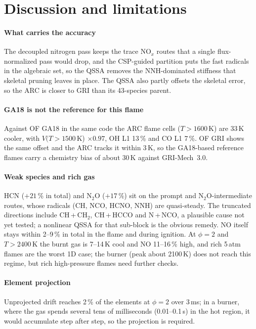 \documentclass[preprint,review,12pt]{elsarticle}
\newcommand{\ce}[1]{\ensuremath{\mathrm{#1}}}
\begin{document}
\section{Discussion and limitations}

\paragraph{What carries the accuracy}
The decoupled nitrogen pass keeps the trace NO$_x$ routes that a single flux-normalized pass would drop, and the
CSP-guided partition puts the fast radicals in the algebraic set, so the QSSA removes the NNH-dominated stiffness that
skeletal pruning leaves in place. The QSSA also partly offsets the skeletal error, so the ARC is closer to GRI than its
43-species parent.

\paragraph{GA18 is not the reference for this flame}
Against OF GA18 in the same code the ARC flame cells ($T>1600$\,K) are 33\,K cooler, with $V(T>1500$\,K)
$\times0.97$, OH L1 13\,\% and CO L1 7\,\%. OF GRI shows the same offset and the ARC tracks it within 3\,K, so the
GA18-based reference flames carry a chemistry bias of about 30\,K against GRI-Mech~3.0.

\paragraph{Weak species and rich gas}
HCN ($+21$\,\% in total) and \ce{N_{2}O} ($+17$\,\%) sit on the prompt and \ce{N_{2}O}-intermediate routes, whose radicals
(CH, NCO, HCNO, NNH) are quasi-steady. The truncated directions include CH\,+\,\ce{CH_{2}}, CH\,+\,HCCO and N\,+\,NCO, a
plausible cause not yet tested; a nonlinear QSSA for that sub-block is the obvious remedy. NO itself stays within
2--9\,\% in total in the flame and during ignition. At $\phi=2$ and $T>2400$\,K the burnt gas is 7--14\,K cool and NO
11--16\,\% high, and rich 5\,atm flames are the worst 1D case; the burner (peak about 2100\,K) does not reach this
regime, but rich high-pressure flames need further checks.

\paragraph{Element projection}
Unprojected drift reaches 2\,\% of the elements at $\phi=2$ over 3\,ms; in a burner, where the gas spends several
tens of milliseconds (0.01--0.1\,s) in the hot region, it would accumulate step after step, so the projection is
required.
\end{document}
